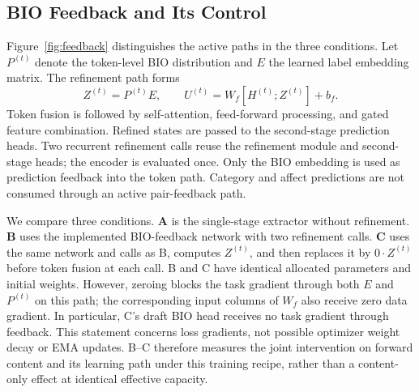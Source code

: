 \documentclass[conference]{IEEEtran}
\begin{document}
\subsection{BIO Feedback and Its Control}

Figure~\ref{fig:feedback} distinguishes the active paths in the three conditions.
Let $P^{(t)}$ denote the token-level BIO distribution and $E$ the learned label embedding matrix. The refinement path forms
\begin{equation}
 Z^{(t)}=P^{(t)}E,\qquad
 U^{(t)}=W_f[H^{(t)};Z^{(t)}]+b_f.
\end{equation}
Token fusion is followed by self-attention, feed-forward processing, and gated feature combination. Refined states are passed to the second-stage prediction heads. Two recurrent refinement calls reuse the refinement module and second-stage heads; the encoder is evaluated once. Only the BIO embedding is used as prediction feedback into the token path. Category and affect predictions are not consumed through an active pair-feedback path.

We compare three conditions. \textbf{A} is the single-stage extractor without refinement. \textbf{B} uses the implemented BIO-feedback network with two refinement calls. \textbf{C} uses the same network and calls as B, computes $Z^{(t)}$, and then replaces it by $0\cdot Z^{(t)}$ before token fusion at each call. B and C have identical allocated parameters and initial weights. However, zeroing blocks the task gradient through both $E$ and $P^{(t)}$ on this path; the corresponding input columns of $W_f$ also receive zero data gradient. In particular, C's draft BIO head receives no task gradient through feedback. This statement concerns loss gradients, not possible optimizer weight decay or EMA updates. B--C therefore measures the joint intervention on forward content and its learning path under this training recipe, rather than a content-only effect at identical effective capacity.
\end{document}
